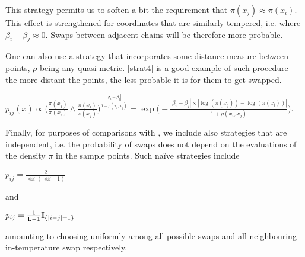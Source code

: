 This strategy permits us to soften a bit the requirement that $\pi(x_j) \approx \pi (x_i)$. This effect is strengthened for coordinates that are similarly tempered, i.e. where $\beta_i - \beta_j \approx 0$. Swaps between adjacent chains will be therefore more probable. 

One can also use a strategy that incorporates some distance measure between points, $\rho$ being any quasi-metric. \ref{strat4} is a good example of such procedure - the more distant the points, the less probable it is for them to get swapped.  

\begin{strategy}[resume]
	\item 
		$p_{ij}(x) \propto \Big( \frac{\pi (x_j)}{\pi( x_i )} \wedge \frac{\pi (x_i)}{\pi( x_j )} \Big)^\frac{|\beta_i - \beta_j|}{1 + \rho(x_i, x_j)} = \exp \Big( - \frac{|\beta_i - \beta_j| \times | \log ( \pi(x_j) ) - \log ( \pi(x_i) ) |}{{1 + \rho(x_i, x_j)}} \Big).$\label{strat4}
\end{strategy} 

Finally, for purposes of comparisons with \citet{BaragattiParallelTemperingWithEquiEnergyMoves}, we include also strategies that are \sspace\, independent, i.e. the probability of swaps does not depend on the evaluations of the density $\pi$ in the sample points. Such na\"ive strategies include 

\begin{strategy}[resume]
	\item $p_{ij} = \frac{2}{\lll (\lll - 1)}$\label{strat5}
\end{strategy}

and 

\begin{strategy}[resume]
	\item $p_{ij} = \frac{1}{\mathrm{L} - 1} \mathbb{I}_{ \{|i-j|=1\} }$\label{strat6}
\end{strategy}

amounting to choosing uniformly among all possible swaps and all neighbouring-in-temperature swap respectively. 